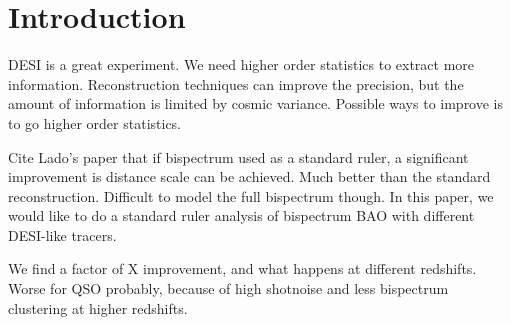 \section{Introduction}
\label{sec:introduction}

DESI is a great experiment. We need higher order statistics to extract more information. Reconstruction techniques can improve the precision, but the amount of information is limited by cosmic variance. Possible ways to improve is to go higher order statistics. 

Cite Lado's paper that if bispectrum used as a standard ruler, a significant improvement is distance scale can be achieved. Much better than the standard reconstruction. Difficult to model the full bispectrum though. In this paper, we would like to do a standard ruler analysis of bispectrum BAO with different DESI-like tracers. 

We find a factor of X improvement, and what happens at different redshifts. Worse for QSO probably, because of high shotnoise and less bispectrum clustering at higher redshifts. 






